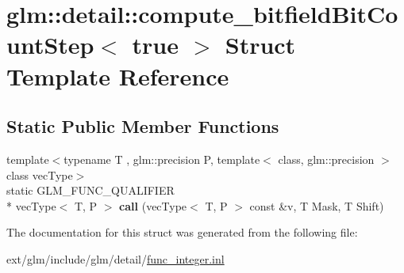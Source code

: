 \hypertarget{structglm_1_1detail_1_1compute__bitfield_bit_count_step_3_01true_01_4}{\section{glm\-:\-:detail\-:\-:compute\-\_\-bitfield\-Bit\-Count\-Step$<$ true $>$ Struct Template Reference}
\label{structglm_1_1detail_1_1compute__bitfield_bit_count_step_3_01true_01_4}
}
\subsection*{Static Public Member Functions}
\begin{DoxyCompactItemize}
\item 
\hypertarget{structglm_1_1detail_1_1compute__bitfield_bit_count_step_3_01true_01_4_a110f77247fc4566bb74e9188ceffa487}{{\footnotesize template$<$typename T , glm\-::precision P, template$<$ class, glm\-::precision $>$ class vec\-Type$>$ }\\static G\-L\-M\-\_\-\-F\-U\-N\-C\-\_\-\-Q\-U\-A\-L\-I\-F\-I\-E\-R \\*
vec\-Type$<$ T, P $>$ {\bfseries call} (vec\-Type$<$ T, P $>$ const \&v, T Mask, T Shift)}\label{structglm_1_1detail_1_1compute__bitfield_bit_count_step_3_01true_01_4_a110f77247fc4566bb74e9188ceffa487}

\end{DoxyCompactItemize}


The documentation for this struct was generated from the following file\-:\begin{DoxyCompactItemize}
\item 
ext/glm/include/glm/detail/\hyperlink{func__integer_8inl}{func\-\_\-integer.\-inl}\end{DoxyCompactItemize}
